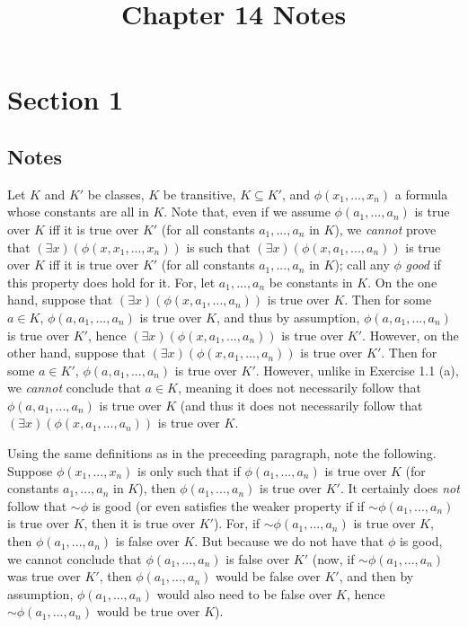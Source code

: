 \documentclass{article}
\title{Chapter 14 Notes}
\newcommand*{\oldneg}{\mathord{\sim}}
\theoremstyle{definition}
\begin{document}
\date{}
\maketitle

\section*{Section 1}

\subsection*{Notes}
Let $K$ and $K'$ be classes, $K$ be transitive, $K\subseteq K'$, and $\phi(x_1,...,x_n)$ a 
formula whose constants are all in $K$. Note that, even if we assume $\phi(a_1,...,a_n)$ is true over $K$ iff 
it is true over $K'$ (for all constants $a_1,...,a_n$ in $K$), we \textit{cannot} prove that 
$(\exists x)(\phi(x,x_1,...,x_n))$ is such that $(\exists x)(\phi(x,a_1,...,a_n))$ is true over $K$ iff it is true 
over $K'$ (for all constants $a_1,...,a_n$ in $K$); call any $\phi$ \textit{good} if this property does hold for it. 
For, let $a_1,...,a_n$ be constants in $K$. On the one hand, 
suppose that $(\exists x)(\phi(x,a_1,...,a_n))$ is true over $K$. Then for some $a\in K$, 
$\phi(a,a_1,...,a_n)$ is true over $K$, and thus by assumption, $\phi(a,a_1,...,a_n)$ is true over $K'$, hence 
$(\exists x)(\phi(x,a_1,...,a_n))$ is true over $K'$. However, on the other hand, suppose that 
$(\exists x)(\phi(x,a_1,...,a_n))$ is true over $K'$. Then for some $a\in K'$, 
$\phi(a,a_1,...,a_n)$ is true over $K'$. However, unlike in Exercise 1.1 (a), we \textit{cannot} conclude that 
$a\in K$, meaning it does not necessarily follow that $\phi(a,a_1,...,a_n)$ is true over $K$ (and thus it does not 
necessarily follow that $(\exists x)(\phi(x,a_1,...,a_n))$ is true over $K$.

Using the same definitions as in the preceeding paragraph, note the following. Suppose $\phi(x_1,...,x_n)$ is only 
such that if $\phi(a_1,...,a_n)$ is true over $K$ (for constants $a_1,...,a_n$ in $K$), then $\phi(a_1,...,a_n)$ is true over $K'$. 
It certainly does \textit{not} follow that $\oldneg\phi$ is good (or even satisfies the weaker property if 
if $\oldneg\phi(a_1,...,a_n)$ is true over $K$, then it is true over $K'$). For, if 
$\oldneg\phi(a_1,...,a_n)$ is true over $K$, then $\phi(a_1,...,a_n)$ is false over $K$. But because we do not have that 
$\phi$ is good, we cannot conclude that $\phi(a_1,...,a_n)$ is false over $K'$ (now, if $\oldneg\phi(a_1,...,a_n)$ was true over 
$K'$, then $\phi(a_1,...,a_n)$ would be false over $K'$, and then by assumption, $\phi(a_1,...,a_n)$ would also need to be false over $K$, hence 
$\oldneg\phi(a_1,...,a_n)$ would be true over $K$).
\end{document}

